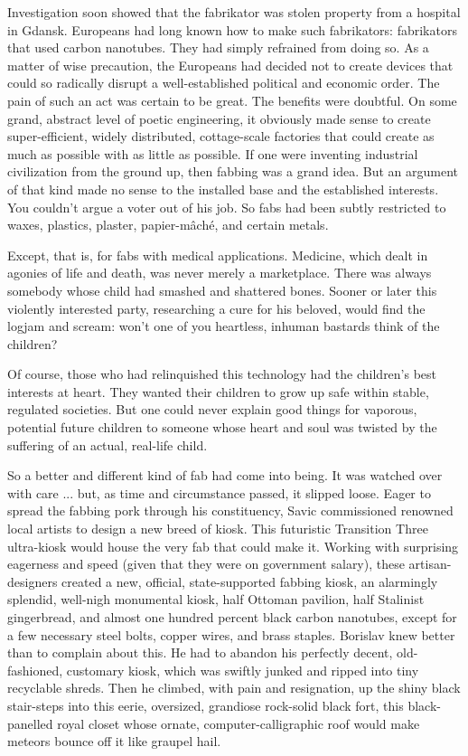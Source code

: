 \documentclass[20 pt,twoside,extrafontsizes,final]{memoir}
\begin{document}
Investigation soon showed that the fabrikator was stolen property from a hospital in Gdansk. Europeans had long known how to make such fabrikators: fabrikators that used carbon nanotubes. They had simply refrained from doing so. As a matter of wise precaution, the Europeans had decided not to create devices that could so radically disrupt a well-established political and economic order. The pain of such an act was certain to be great. The benefits were doubtful. On some grand, abstract level of poetic engineering, it obviously made sense to create super-efficient, widely distributed, cottage-scale factories that could create as much as possible with as little as possible. If one were inventing industrial civilization from the ground up, then fabbing was a grand idea. But an argument of that kind made no sense to the installed base and the established interests. You couldn't argue a voter out of his job. So fabs had been subtly restricted to waxes, plastics, plaster, papier-m\^ach\'e, and certain metals.

Except, that is, for fabs with medical applications. Medicine, which dealt in agonies of life and death, was never merely a marketplace. There was always somebody whose child had smashed and shattered bones. Sooner or later this violently interested party, researching a cure for his beloved, would find the logjam and scream: won't one of you heartless, inhuman bastards think of the children?

Of course, those who had relinquished this technology had the children's best interests at heart. They wanted their children to grow up safe within stable, regulated societies. But one could never explain good things for vaporous, potential future children to someone whose heart and soul was twisted by the suffering of an actual, real-life child.

So a better and different kind of fab had come into being. It was watched over with care ... but, as time and circumstance passed, it slipped loose. Eager to spread the fabbing pork through his constituency, Savic commissioned renowned local artists to design a new breed of kiosk. This futuristic Transition Three ultra-kiosk would house the very fab that could make it. Working with surprising eagerness and speed (given that they were on government salary), these artisan-designers created a new, official, state-supported fabbing kiosk, an alarmingly splendid, well-nigh monumental kiosk, half Ottoman pavilion, half Stalinist gingerbread, and almost one hundred percent black carbon nanotubes, except for a few necessary steel bolts, copper wires, and brass staples. Borislav knew better than to complain about this. He had to abandon his perfectly decent, old-fashioned, customary kiosk, which was swiftly junked and ripped into tiny recyclable shreds. Then he climbed, with pain and resignation, up the shiny black stair-steps into this eerie, oversized, grandiose rock-solid black fort, this black-panelled royal closet whose ornate, computer-calligraphic roof would make meteors bounce off it like graupel hail.
\end{document}
